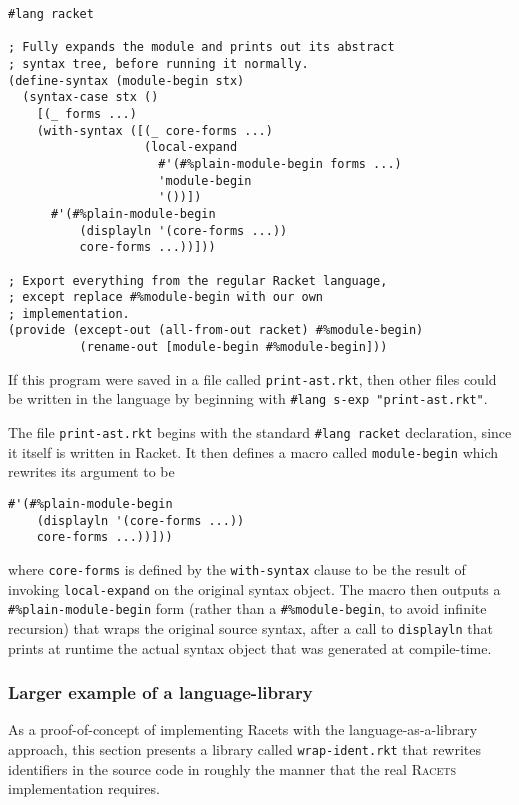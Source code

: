 \documentclass{article}
\begin{document}
\begin{lstlisting}
#lang racket

; Fully expands the module and prints out its abstract
; syntax tree, before running it normally.
(define-syntax (module-begin stx)
  (syntax-case stx ()
    [(_ forms ...)
    (with-syntax ([(_ core-forms ...)
                   (local-expand
                     #'(#%plain-module-begin forms ...)
                     'module-begin
                     '())])
      #'(#%plain-module-begin
          (displayln '(core-forms ...))
          core-forms ...))]))

; Export everything from the regular Racket language,
; except replace #%module-begin with our own
; implementation.
(provide (except-out (all-from-out racket) #%module-begin)
          (rename-out [module-begin #%module-begin]))
\end{lstlisting}

If this program were saved in a file called \texttt{print-ast.rkt}, then other files could be written in the language by beginning with \texttt{\#lang s-exp "print-ast.rkt"}.

The file \texttt{print-ast.rkt} begins with the standard \texttt{\#lang racket} declaration, since it itself is written in Racket. It then defines a macro called \texttt{module-begin} which rewrites its argument to be

\begin{lstlisting}
#'(#%plain-module-begin
    (displayln '(core-forms ...))
    core-forms ...))]))
\end{lstlisting}

\noindent where \texttt{core-forms} is defined by the \texttt{with-syntax} clause to be the result of invoking \texttt{local-expand} on the original syntax object. The macro then outputs a \texttt{\#\%plain-module-begin} form (rather than a \texttt{\#\%module-begin}, to avoid infinite recursion) that wraps the original source syntax, after a call to \texttt{displayln} that prints at runtime the actual syntax object that was generated at compile-time.


\subsubsection{Larger example of a language-library}
As a proof-of-concept of implementing Racets with the language-as-a-library approach, this section presents a library called \texttt{wrap-ident.rkt} that rewrites identifiers in the source code in roughly the manner that the real \textsc{Racets} implementation requires.
\end{document}
